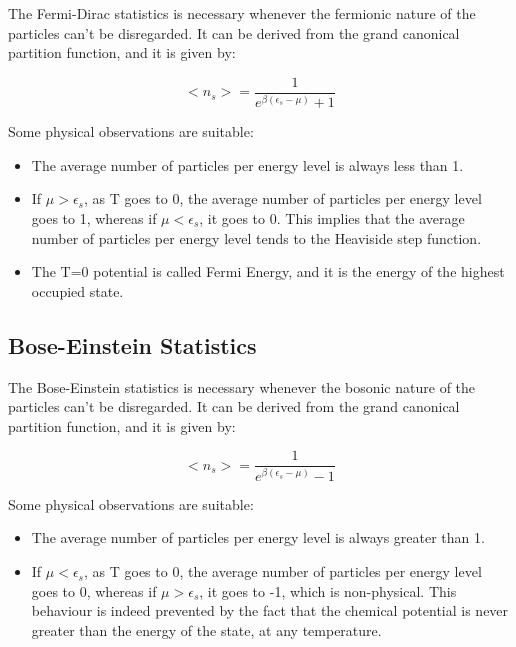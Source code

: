 \documentclass{article}
\begin{document}
The Fermi-Dirac statistics is necessary whenever the fermionic nature of the particles
can't be disregarded.
It can be derived from the grand canonical partition function, and it is given by:

\begin{equation}
    <n_s>=\frac{1}{e^{\beta(\epsilon_s-\mu)}+1}
\end{equation}

Some physical observations are suitable:

\begin{itemize}
    \item The average number of particles per energy level is always less than 1.
    \item If $\mu>\epsilon_s$, as T goes to 0, the average number of particles per energy level goes to 1,
          whereas if $\mu<\epsilon_s$, it goes to 0. This implies that the average number of particles per energy level tends to
          the Heaviside step function.
    \item The T=0 potential is called Fermi Energy, and it is the energy of the highest occupied state.
\end{itemize}

\subsection{Bose-Einstein Statistics}

The Bose-Einstein statistics is necessary whenever the bosonic nature of the particles
can't be disregarded.
It can be derived from the grand canonical partition function, and it is given by:

\begin{equation}
    <n_s>=\frac{1}{e^{\beta(\epsilon_s-\mu)}-1}
\end{equation}

Some physical observations are suitable:

\begin{itemize}
    \item The average number of particles per energy level is always greater than 1.
    \item If $\mu<\epsilon_s$, as T goes to 0, the average number of particles per energy level goes to 0,
          whereas if $\mu>\epsilon_s$, it goes to -1, which is non-physical. This behaviour is indeed prevented by
          the fact that the chemical potential is never greater than the energy of the state, at any temperature.
\end{itemize}
\end{document}
